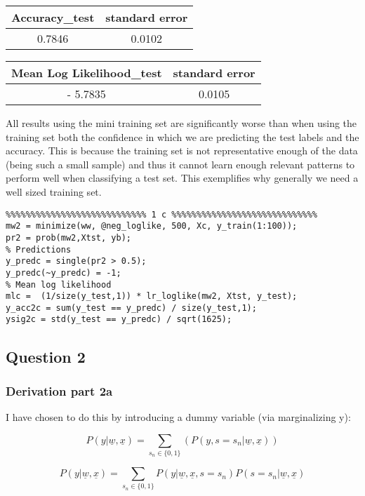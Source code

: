 \documentclass[11pt]{article}
\begin{document}


\begin{center}
\begin{tabular}{|c|c|}
\hline
Accuracy\_test & standard error \\
 \hline
0.7846 & 0.0102  \\
\hline
\end{tabular}
\begin{tabular}{|c|c|}
\hline
Mean Log Likelihood\_test & standard error \\
 \hline
- 5.7835 & 0.0105 \\
\hline
\end{tabular}
\end{center}

All results using the mini training set are significantly worse than when using the training set both the confidence in which we are predicting the test labels and the accuracy.  This is because the training set is not representative enough of the data (being such a small sample) and thus it cannot learn enough relevant patterns to perform well when classifying a test set. This exemplifies  why generally we need a well sized training set.

\begin{lstlisting}
%%%%%%%%%%%%%%%%%%%%%%%%%%%% 1 c %%%%%%%%%%%%%%%%%%%%%%%%%%%%%
mw2 = minimize(ww, @neg_loglike, 500, Xc, y_train(1:100));
pr2 = prob(mw2,Xtst, yb);
% Predictions
y_predc = single(pr2 > 0.5);
y_predc(~y_predc) = -1;
% Mean log likelihood
mlc =  (1/size(y_test,1)) * lr_loglike(mw2, Xtst, y_test);
y_acc2c = sum(y_test == y_predc) / size(y_test,1);
ysig2c = std(y_test == y_predc) / sqrt(1625);
\end{lstlisting}


\subsection{Question 2}
\subsubsection{Derivation part 2a}

I have chosen to do this by introducing a dummy variable (via marginalizing y):

\[
P(y| \underline{w}, \underline{x}) = \sum_{s_{n}\in \{ 0,1\}}(P(y,s  = s_{n} | \underline{w}, \underline{x}))
\]

\[
P(y| \underline{w}, \underline{x}) = \sum_{s_{n}\in \{ 0,1\}}P(y | \underline{w}, \underline{x},s = s_{n})P( s= s_{n}|\underline{w}, \underline{x}) 
\]
\end{document}
